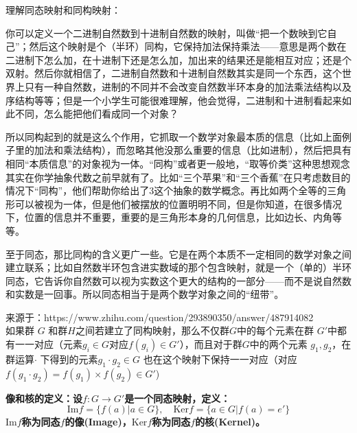 \documentclass[12pt]{article}
\begin{document}
\begin{framed}
\small {
理解同态映射和同构映射：

你可以定义一个二进制自然数到十进制自然数的映射，叫做“把一个数映到它自己”；然后这个映射是个（半环）同构，它保持加法保持乘法——意思是两个数在二进制下怎么加，在十进制下还是怎么加，加出来的结果还是能相互对应；还是个双射。然后你就相信了，二进制自然数和十进制自然数其实是同一个东西，这个世界上只有一种自然数，进制的不同并不会改变自然数半环本身的加法乘法结构以及序结构等等；但是一个小学生可能很难理解，他会觉得，二进制和十进制看起来如此不同，怎么能把他们看成同一个对象？

所以同构起到的就是这么个作用，它抓取一个数学对象最本质的信息（比如上面例子里的加法和乘法结构），而忽略其他没那么重要的信息（比如进制），然后把具有相同“本质信息”的对象视为一体。“同构”或者更一般地，“取等价类”这种思想观念其实在你学抽象代数之前早就有了。比如“三个苹果”和“三个香蕉”在只考虑数目的情况下“同构”，他们帮助你给出了3这个抽象的数学概念。再比如两个全等的三角形可以被视为一体，但是他们被摆放的位置明明不同，但是你知道，在很多情况下，位置的信息并不重要，重要的是三角形本身的几何信息，比如边长、内角等等。

至于同态，那比同构的含义更广一些。它是在两个本质不一定相同的数学对象之间建立联系；比如自然数半环包含进实数域的那个包含映射，就是一个（单的）半环同态，它告诉你自然数可以视为实数这个更大的结构的一部分——而不是说自然数和实数是一回事。所以同态相当于是两个数学对象之间的“纽带”。

来源于：https://www.zhihu.com/question/293890350/answer/487914082
~\\

如果群 $G$ 和群$H$之间若建立了同构映射，那么不仅群$G$中的每个元素在群 $G'$中都有一一对应（元素$g_i \in G$对应$f(g_i) \in G'$），而且对于群$G$中的两个元素 $g_1, g_2$，在群运算$\cdot$ 下得到的元素$g_1 \cdot g_2 \in G$ 也在这个映射下保持一一对应（对应$f(g_1 \cdot g_2) = f(g_1) \times f(g_2) \in G'$)
~\\
}
\end{framed}

\begin{mdframed}[
linecolor=black!40,outerlinewidth=1pt,roundcorner=.5em,innertopmargin=1ex,innerbottommargin=.5\baselineskip,innerrightmargin=1em,innerleftmargin=1em,backgroundcolor=gray!5,
]
\textbf{
像和核的定义：设$f: G \rightarrow G'$是一个同态映射，定义：
$$
\text{Im} f = \{f(a) | a \in G\}, \quad \text{Ker} f = \{a \in G| f(a) = e'\}
$$
$\text{Im} f$称为同态$f$的像(Image)，$\text{Ker} f$称为同态$f$的核(Kernel)。
}
\end{mdframed}
\end{document}
